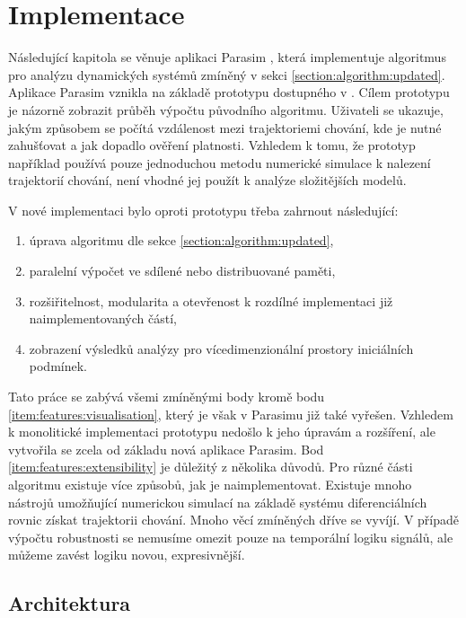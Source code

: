 \chapter{Implementace}\label{chapter:implementation}
Následující kapitola se věnuje aplikaci Parasim \cite{TODO}, která implementuje algoritmus pro
analýzu dynamických systémů zmíněný v sekci \ref{section:algorithm:updated}. Aplikace Parasim
vznikla na základě prototypu dostupného v \cite{drazan2011}. Cílem prototypu je názorně
zobrazit průběh výpočtu původního algoritmu. Uživateli se ukazuje, jakým způsobem
se počítá vzdálenost mezi trajektoriemi chování, kde je nutné zahušťovat a jak dopadlo
ověření platnosti. Vzhledem k tomu, že prototyp například používá pouze jednoduchou metodu
numerické simulace k nalezení trajektorií chování, není vhodné jej použít k analýze složitějších modelů.

V nové implementaci bylo oproti prototypu třeba zahrnout následující:

\begin{enumerate}
	\item	úprava algoritmu dle sekce \ref{section:algorithm:updated},
	\item	paralelní výpočet ve sdílené nebo distribuované paměti,
	\item	rozšiřitelnost, modularita a otevřenost k rozdílné implementaci již naimplementovaných částí,\label{item:features:extensibility}
	\item	zobrazení výsledků analýzy pro vícedimenzionální prostory ini\-ciál\-ních podmínek.\label{item:features:visualisation}
\end{enumerate}

Tato práce se zabývá všemi zmíněnými body kromě bodu \ref{item:features:visualisation},
který je však v Parasimu již také vyřešen. Vzhledem k monolitické implementaci prototypu
nedošlo k jeho úpravám a rozšíření, ale vytvořila se zcela od základu nová aplikace Parasim.
Bod \ref{item:features:extensibility} je důležitý z několika důvodů. Pro různé části algoritmu
existuje více způsobů, jak je naimplementovat. Existuje mnoho nástrojů umožňující
numerickou simulací na základě systému diferenciálních rovnic získat trajektorii chování.
Mnoho věcí zmíněných dříve se vyvíjí. V případě výpočtu robustnosti se nemusíme omezit
pouze na temporální logiku signálů, ale můžeme zavést logiku novou, expresivněj\-ší.

\section{Architektura}

